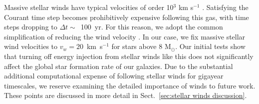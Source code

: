 \documentclass[fleqn,usenatbib,useAMS]{mnras}
\newcommand{\ccunit}{cm$^{-3}$}
\begin{document}
Massive stellar winds have typical velocities of order 10$^{3}$ km s$^{-1}$ \citep{Leitherer1992}. Satisfying the Courant time step becomes prohibitively expensive following this gas, with time steps dropping to $\Delta t \sim$~100~yr. For this reason, we adopt the common simplification of reducing the wind velocity \citep[e.g][]{Offner2015}. In our case, we fix massive stellar wind velocities to $v_w = 20$~km~s$^{-1}$ for stars above 8 M$_{\odot}$. Our initial tests show that turning off energy injection from stellar winds like this does not significantly affect the global star formation rate of our galaxies. Due to the substantial additional computational expense of following stellar winds for gigayear timescales, we reserve examining the detailed importance of winds to future work. These points are discussed in more detail in Sect.~\ref{sec:stellar winds discussion}.


\end{document}
